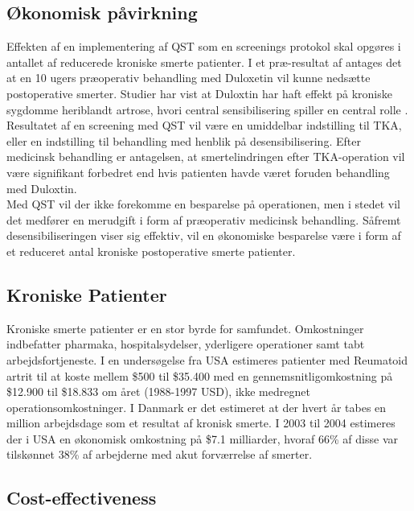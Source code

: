 \subsection{Økonomisk påvirkning} %
Effekten af en implementering af QST som en screenings protokol skal opgøres i antallet af reducerede kroniske smerte patienter. I et præ-resultat af  antages det at en 10 ugers præoperativ behandling med Duloxetin vil kunne nedsætte postoperative smerter. Studier har vist at Duloxtin har haft effekt på kroniske sygdomme heriblandt artrose, hvori central sensibilisering spiller en central rolle \citep{Blikman2016}. Resultatet af en screening med QST vil være en umiddelbar indstilling til TKA, eller en indstilling til behandling med henblik på desensibilisering. Efter medicinsk behandling er antagelsen, at smertelindringen efter TKA-operation vil være signifikant forbedret end hvis patienten havde været foruden behandling med Duloxtin. \citep{Blikman2016} \\
Med QST vil der ikke forekomme en besparelse på operationen, men i stedet vil det medfører en merudgift i form af præoperativ medicinsk behandling. Såfremt desensibiliseringen viser sig effektiv, vil en økonomiske besparelse være i form af et reduceret antal kroniske postoperative smerte patienter.

\subsection{Kroniske Patienter}

Kroniske smerte patienter er en stor byrde for samfundet. Omkostninger indbefatter pharmaka, hospitalsydelser, yderligere operationer samt tabt arbejdsfortjeneste. I en undersøgelse fra USA estimeres patienter med Reumatoid artrit til at koste mellem \$500 til \$35.400 med en gennemsnitligomkostning på \$12.900 til \$18.833 om året (1988-1997 USD), ikke medregnet operationsomkostninger. \citep{Turk2002} I Danmark er det estimeret at der hvert år tabes en million arbejdsdage som et resultat af kronisk smerte. \citep{Eriksen2006} I 2003 til 2004 estimeres der i USA en økonomisk omkostning på \$7.1 milliarder, hvoraf 66\% af disse var tilskønnet 38\% af arbejderne med akut forværrelse af smerter. \citep{Phillips2009} %

\subsection{Cost-effectiveness}

